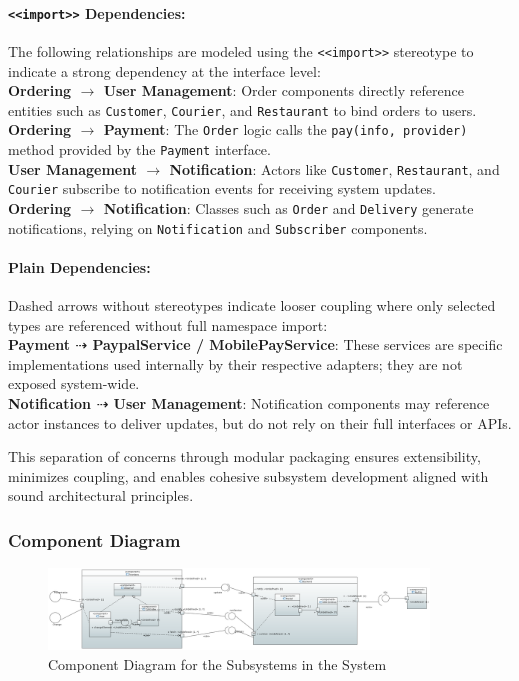 \paragraph{\textbf{\texttt{<<import>>}} Dependencies:}The following relationships are modeled using the \texttt{<<import>>} stereotype to indicate a strong dependency at the interface level:\\
\textbf{Ordering $\rightarrow$ User Management}: Order components directly reference entities such as \texttt{Customer}, \texttt{Courier}, and \texttt{Restaurant} to bind orders to users.\\
\textbf{Ordering $\rightarrow$ Payment}: The \texttt{Order} logic calls the \texttt{pay(info, provider)} method provided by the \texttt{Payment} interface.\\
\textbf{User Management $\rightarrow$ Notification}: Actors like \texttt{Customer}, \texttt{Restaurant}, and \texttt{Courier} subscribe to notification events for receiving system updates.\\
\textbf{Ordering $\rightarrow$ Notification}: Classes such as \texttt{Order} and \texttt{Delivery} generate notifications, relying on \texttt{Notification} and \texttt{Subscriber} components.

\paragraph{Plain Dependencies:}Dashed arrows without stereotypes indicate looser coupling where only selected types are referenced without full namespace import:\\
\textbf{Payment $\dashrightarrow$ PaypalService / MobilePayService}: These services are specific implementations used internally by their respective adapters; they are not exposed system-wide.\\
\textbf{Notification $\dashrightarrow$ User Management}: Notification components may reference actor instances to deliver updates, but do not rely on their full interfaces or APIs.

This separation of concerns through modular packaging ensures extensibility, minimizes coupling, and enables cohesive subsystem development aligned with sound architectural principles.

\subsubsection{Component Diagram}

\begin{figure}[H]
    \centering
    \includegraphics[width=0.9\textwidth]{FIGS/Subsystems.PNG}
    \caption{Component Diagram for the Subsystems in the System}
\end{figure}

